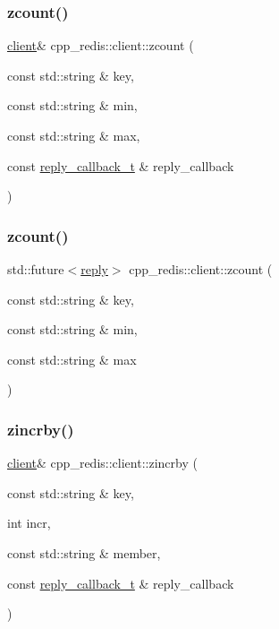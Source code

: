 \subsubsection{\texorpdfstring{zcount()}{zcount()}\hspace{0.1cm}{\footnotesize\ttfamily [5/6]}}
{\footnotesize\ttfamily \hyperlink{classcpp__redis_1_1client}{client}\& cpp\+\_\+redis\+::client\+::zcount (\begin{DoxyParamCaption}\item[{const std\+::string \&}]{key,  }\item[{const std\+::string \&}]{min,  }\item[{const std\+::string \&}]{max,  }\item[{const \hyperlink{classcpp__redis_1_1client_a061a1140d36d2eaeda82b09a0bb3f9f2}{reply\+\_\+callback\+\_\+t} \&}]{reply\+\_\+callback }\end{DoxyParamCaption})}

\mbox{\label{classcpp__redis_1_1client_a94416b729f3ecd32d41450725e773590}} 
\subsubsection{\texorpdfstring{zcount()}{zcount()}\hspace{0.1cm}{\footnotesize\ttfamily [6/6]}}
{\footnotesize\ttfamily std\+::future$<$\hyperlink{classcpp__redis_1_1reply}{reply}$>$ cpp\+\_\+redis\+::client\+::zcount (\begin{DoxyParamCaption}\item[{const std\+::string \&}]{key,  }\item[{const std\+::string \&}]{min,  }\item[{const std\+::string \&}]{max }\end{DoxyParamCaption})}

\mbox{\label{classcpp__redis_1_1client_a7852309fc3054c1bce760e4e2189205b}} 
\subsubsection{\texorpdfstring{zincrby()}{zincrby()}\hspace{0.1cm}{\footnotesize\ttfamily [1/6]}}
{\footnotesize\ttfamily \hyperlink{classcpp__redis_1_1client}{client}\& cpp\+\_\+redis\+::client\+::zincrby (\begin{DoxyParamCaption}\item[{const std\+::string \&}]{key,  }\item[{int}]{incr,  }\item[{const std\+::string \&}]{member,  }\item[{const \hyperlink{classcpp__redis_1_1client_a061a1140d36d2eaeda82b09a0bb3f9f2}{reply\+\_\+callback\+\_\+t} \&}]{reply\+\_\+callback }\end{DoxyParamCaption})}

